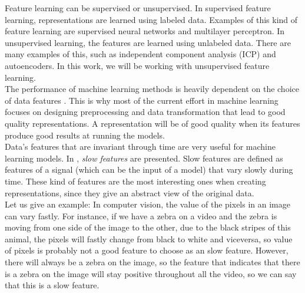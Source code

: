 Feature learning can be supervised or unsupervised. In supervised feature learning, representations are learned using labeled data.
Examples of this kind of feature learning are supervised neural networks and multilayer perceptron. In unsupervised learning, the features are learned using unlabeled data. 
There are many examples of this, such as independent component analysis (ICP) and autoencoders. In this work, we will be working with unsupervised feature learning.\\


The performance of machine learning methods is heavily dependent on the choice of data features \cite{bengio_representation_2014}. This is why most of the current 
effort in machine learning focuses on designing preprocessing and data transformation that lead to good quality representations. A representation will be of good quality when its features
produce good results at running the models.\\

Data's features that are invariant through time are very useful for machine learning models. In \cite{wiskott_slow_2002}, \emph{slow features} are presented. Slow features are defined as features of a signal 
(which can be the input of a model) that vary slowly during time. These kind of features are the most interesting ones when creating representations, since they give an abstract view of the original data.\\

Let us give an example: In computer vision, the value of the pixels in an image can vary fastly. For instance, if we have a zebra on a video and the zebra is moving from one side of the image to the other, due 
to the black stripes of this animal, the pixels will fastly change from black to white and viceversa, so value of pixels is probably not a good feature to choose as an slow feature. However, there will always
be a zebra on the image, so the feature that indicates that there is a zebra on the image will stay positive throughout all the video, so we can say that this is a slow feature.